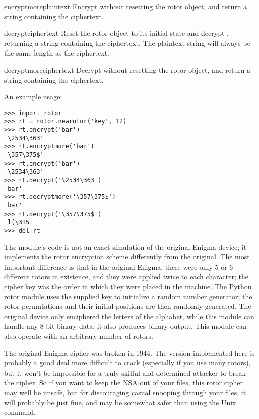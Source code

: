 \begin{funcdesc}{encryptmore}{plaintext}
Encrypt  without resetting the rotor object, and return a
string containing the ciphertext.
\end{funcdesc}

\begin{funcdesc}{decrypt}{ciphertext}
Reset the rotor object to its initial state and decrypt ,
returning a string containing the ciphertext.  The plaintext string will
always be the same length as the ciphertext.
\end{funcdesc}

\begin{funcdesc}{decryptmore}{ciphertext}
Decrypt  without resetting the rotor object, and return a
string containing the ciphertext.
\end{funcdesc}

An example usage:
\bcode\begin{verbatim}
>>> import rotor
>>> rt = rotor.newrotor('key', 12)
>>> rt.encrypt('bar')
'\2534\363'
>>> rt.encryptmore('bar')
'\357\375$'
>>> rt.encrypt('bar')
'\2534\363'
>>> rt.decrypt('\2534\363')
'bar'
>>> rt.decryptmore('\357\375$')
'bar'
>>> rt.decrypt('\357\375$')
'l(\315'
>>> del rt
\end{verbatim}\ecode

The module's code is not an exact simulation of the original Enigma device;
it implements the rotor encryption scheme differently from the original. The
most important difference is that in the original Enigma, there were only 5
or 6 different rotors in existence, and they were applied twice to each
character; the cipher key was the order in which they were placed in the
machine.  The Python rotor module uses the supplied key to initialize a
random number generator; the rotor permutations and their initial positions
are then randomly generated.  The original device only enciphered the
letters of the alphabet, while this module can handle any 8-bit binary data;
it also produces binary output.  This module can also operate with an
arbitrary number of rotors.

The original Enigma cipher was broken in 1944. %
The version implemented here is probably a good deal more difficult to crack
(especially if you use many rotors), but it won't be impossible for
a truly skilful and determined attacker to break the cipher.  So if you want
to keep the NSA out of your files, this rotor cipher may well be unsafe, but
for discouraging casual snooping through your files, it will probably be
just fine, and may be somewhat safer than using the Unix 
command.

